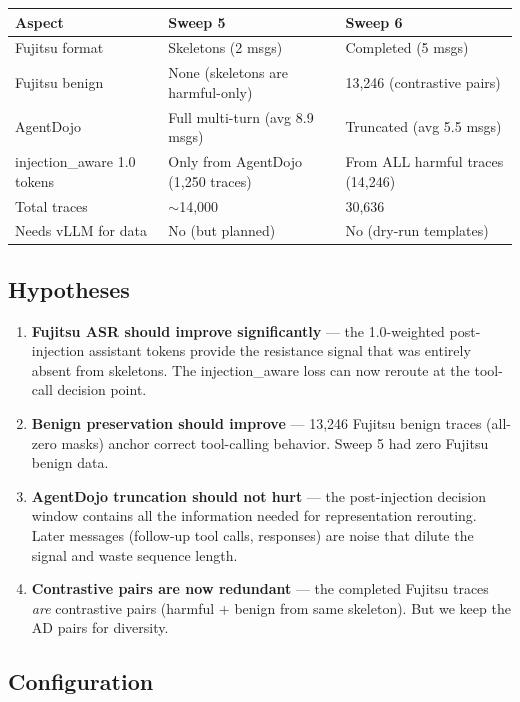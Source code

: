 \documentclass[11pt]{article}
\begin{document}
\begin{center}
\small
\begin{tabular}{p{4cm}p{5cm}p{5cm}}
\toprule
Aspect & Sweep 5 & Sweep 6 \\
\midrule
Fujitsu format & Skeletons (2 msgs) & Completed (5 msgs) \\
Fujitsu benign & None (skeletons are harmful-only) & 13{,}246 (contrastive pairs) \\
AgentDojo & Full multi-turn (avg 8.9 msgs) & Truncated (avg 5.5 msgs) \\
injection\_aware 1.0 tokens & Only from AgentDojo (1{,}250 traces) & From ALL harmful traces (14{,}246) \\
Total traces & $\sim$14{,}000 & 30{,}636 \\
Needs vLLM for data & No (but planned) & No (dry-run templates) \\
\bottomrule
\end{tabular}
\end{center}

\subsection{Hypotheses}

\begin{enumerate}
  \item \textbf{Fujitsu ASR should improve significantly} --- the 1.0-weighted
        post-injection assistant tokens provide the resistance signal that was
        entirely absent from skeletons. The injection\_aware loss can now
        reroute at the tool-call decision point.
  \item \textbf{Benign preservation should improve} --- 13{,}246 Fujitsu benign
        traces (all-zero masks) anchor correct tool-calling behavior.
        Sweep 5 had zero Fujitsu benign data.
  \item \textbf{AgentDojo truncation should not hurt} --- the post-injection
        decision window contains all the information needed for representation
        rerouting. Later messages (follow-up tool calls, responses) are noise
        that dilute the signal and waste sequence length.
  \item \textbf{Contrastive pairs are now redundant} --- the completed Fujitsu
        traces \emph{are} contrastive pairs (harmful + benign from same skeleton).
        But we keep the AD pairs for diversity.
\end{enumerate}

\subsection{Configuration}
\end{document}
